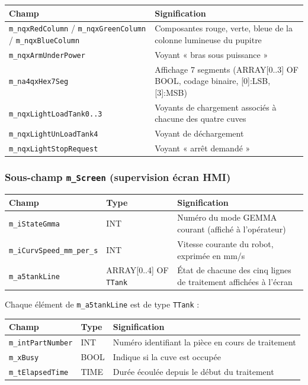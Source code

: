 \begin{center}
\begin{tabular}{|l|p{8.5cm}|}
\hline
\textbf{Champ} & \textbf{Signification} \\
\hline
\texttt{m\_nqxRedColumn} / \texttt{m\_nqxGreenColumn} / \texttt{m\_nqxBlueColumn} &
Composantes rouge, verte, bleue de la colonne lumineuse du pupitre \\
\hline
\texttt{m\_nqxArmUnderPower} & Voyant « bras sous puissance » \\
\hline
\texttt{m\_na4qxHex7Seg} & Affichage 7 segments (ARRAY[0..3] OF BOOL,
codage binaire, [0]:LSB, [3]:MSB) \\
\hline
\texttt{m\_nqxLightLoadTank0..3} & Voyants de chargement associés à chacune
des quatre cuves \\
\hline
\texttt{m\_nqxLightUnLoadTank4} & Voyant de déchargement \\
\hline
\texttt{m\_nqxLightStopRequest} & Voyant « arrêt demandé » \\
\hline
\end{tabular}
\end{center}

\subsubsection{Sous-champ \texttt{m\_Screen} (supervision écran HMI)}

\begin{center}
\begin{tabular}{|l|l|p{6cm}|}
\hline
\textbf{Champ} & \textbf{Type} & \textbf{Signification} \\
\hline
\texttt{m\_iStateGmma} & INT & Numéro du mode GEMMA courant (affiché à
l'opérateur) \\
\hline
\texttt{m\_iCurvSpeed\_mm\_per\_s} & INT & Vitesse courante du robot,
exprimée en mm/s \\
\hline
\texttt{m\_a5tankLine} & ARRAY[0..4] OF \texttt{TTank} & État de chacune
des cinq lignes de traitement affichées à l'écran \\
\hline
\end{tabular}
\end{center}

Chaque élément de \texttt{m\_a5tankLine} est de type \texttt{TTank} :

\begin{center}
\begin{tabular}{|l|l|p{6.5cm}|}
\hline
\textbf{Champ} & \textbf{Type} & \textbf{Signification} \\
\hline
\texttt{m\_intPartNumber} & INT & Numéro identifiant la pièce en cours de
traitement \\
\hline
\texttt{m\_xBusy} & BOOL & Indique si la cuve est occupée \\
\hline
\texttt{m\_tElapsedTime} & TIME & Durée écoulée depuis le début du
traitement \\
\hline
\end{tabular}
\end{center}

